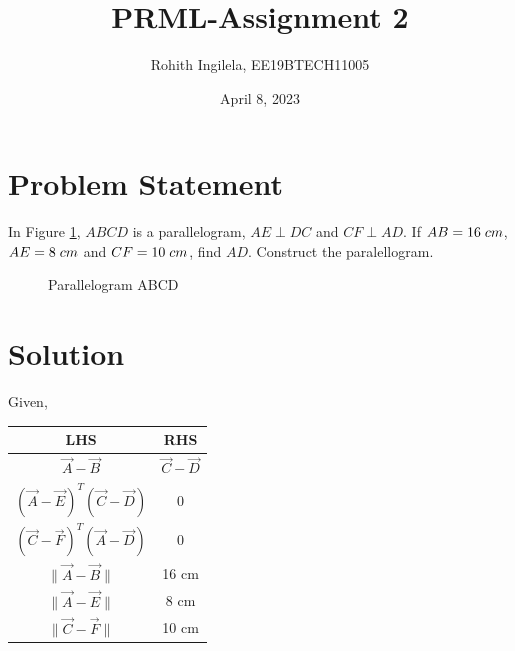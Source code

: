 \documentclass[letterpaper,12pt]{article}
\title{PRML-Assignment 2}
\author{Rohith Ingilela,  EE19BTECH11005 }
\date{April 8, 2023}
\begin{document}
\maketitle

\section{Problem Statement}

In Figure \ref*{fig:fig1}, $ABCD$ is a parallelogram, $AE \perp DC$
and $CF \perp AD$. If $AB = 16 \hspace{0.1cm} cm$, $AE = 8 \hspace{0.1cm} cm$ and
$CF = 10 \hspace{0.1cm} cm$, find $AD$. Construct the paralellogram.

\begin{figure}[!ht]
\centering


\caption{Parallelogram ABCD}
\label{fig:fig1}
\end{figure}
\section{Solution}

Given,

\setlength{\arrayrulewidth}{0.5mm}
\setlength{\tabcolsep}{30pt}
\setlength\extrarowheight{10pt}

\begin{center}
\begin{tabular}{||c|c||} 
 \hline
 \hline
 \textbf{LHS} & \textbf{RHS} \\
 \hline
 $\Vec{A}-\Vec{B}$ & $\Vec{C}-\Vec{D}$ \\
 \hline
 $(\Vec{A} - \Vec{E})^T (\Vec{C} - \Vec{D})$ & 0 \\
 \hline
 $(\Vec{C} - \Vec{F})^T (\Vec{A} - \Vec{D})$ & 0 \\
 \hline
 $\|\Vec{A} - \Vec{B}\|$ & 16 cm \\
 \hline
  $\|\Vec{A} - \Vec{E}\|$ & 8 cm \\
 \hline
 $\|\Vec{C} - \Vec{F}\|$ & 10 cm \\
 \hline
 \hline
\end{tabular}
\end{center}
\end{document}
